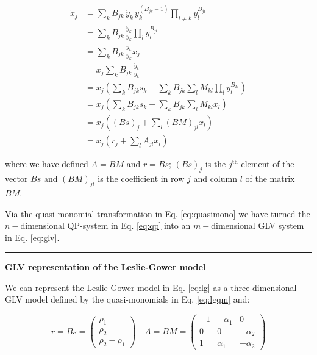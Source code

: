 \documentclass{article}
\begin{document}
\begin{equation}
\label{eq:quasimonodt}
\begin{aligned}
\dot{x}_j &= \sum_k B_{jk}\, \dot{y}_k \, y_{k}^{(B_{jk} -1)} \prod_{l \neq k} y_{l}^{B_{jl}}\\
&=\sum_k B_{jk}\, \frac{\dot{y}_k}{y_k} \prod_{l} y_{l}^{B_{jl}}\\
&=\sum_k B_{jk}\, \frac{\dot{y}_k}{y_k} x_j\\
&=x_j \sum_k B_{jk}\, \frac{\dot{y}_k}{y_k} \\
&=x_j \left(\sum_k B_{jk} s_k + \sum_k B_{jk} \sum_l M_{kl} \prod_l y_l^{B_{kl}} \right)\\
&=x_j \left(\sum_k B_{jk} s_k + \sum_k B_{jk} \sum_l M_{kl} x_l \right)\\
&=x_j \left((B s)_j + \sum_l (B M)_{jl} x_l \right)\\
&=x_j \left(r_j + \sum_l A_{jl} x_l \right)
\end{aligned}
\end{equation}

where we have defined \(A = BM\) and \(r = B s\); \((Bs)_j\) is the
\(j^{\text{th}}\) element of the vector \(Bs\) and \((B M)_{jl}\) is the
coefficient in row \(j\) and column \(l\) of the matrix \(BM\).

Via the quasi-monomial transformation in Eq. \ref{eq:quasimono} we have
turned the \(n-\)dimensional QP-system in Eq. \ref{eq:qp} into an
\(m-\)dimensional GLV system in Eq. \ref{eq:glv}.

\begin{center}\rule{0.5\linewidth}{0.5pt}\end{center}

\textbf{GLV representation of the Leslie-Gower model}

We can represent the Leslie-Gower model in Eq. \ref{eq:lg} as a
three-dimensional GLV model defined by the quasi-monomials in Eq.
\ref{eq:lgqm} and:

\begin{equation}
r = B s = \begin{pmatrix}
\rho_1\\
\rho_2\\
\rho_2 - \rho_1
\end{pmatrix}
\quad
A = B M = \begin{pmatrix}
-1 & -\alpha_1 & 0\\
0 & 0 & -\alpha_2\\
1 & \alpha_1 & -\alpha_2
\end{pmatrix}
\end{equation}
\end{document}
